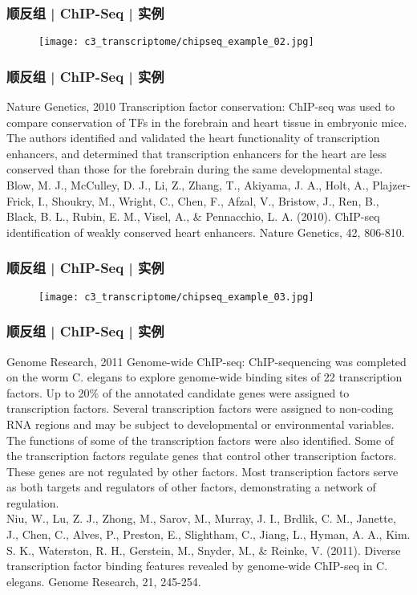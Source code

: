 \begin{frame}
  \frametitle{顺反组 | ChIP-Seq | 实例}
  \begin{figure}
    \centering
    \texttt{[image: c3\_transcriptome/chipseq\_example\_02.jpg]}
  \end{figure}
\end{frame}

\begin{frame}
  \frametitle{顺反组 | ChIP-Seq | 实例}
  \begin{block}{Nature Genetics, 2010}
  Transcription factor conservation: ChIP-seq was used to compare conservation of TFs in the forebrain and heart tissue in embryonic mice. The authors identified and validated the heart functionality of transcription enhancers, and determined that transcription enhancers for the heart are less conserved than those for the forebrain during the same developmental stage.\\
  \vspace{0.5em}
  Blow, M. J., McCulley, D. J., Li, Z., Zhang, T., Akiyama, J. A., Holt, A., Plajzer-Frick, I., Shoukry, M., Wright, C., Chen, F., Afzal, V., Bristow, J., Ren, B., Black, B. L., Rubin, E. M., Visel, A., \& Pennacchio, L. A. (2010). ChIP-seq identification of weakly conserved heart enhancers. Nature Genetics, 42, 806-810.
  \end{block}
\end{frame}

\begin{frame}
  \frametitle{顺反组 | ChIP-Seq | 实例}
  \begin{figure}
    \centering
    \texttt{[image: c3\_transcriptome/chipseq\_example\_03.jpg]}
  \end{figure}
\end{frame}

\begin{frame}
  \frametitle{顺反组 | ChIP-Seq | 实例}
  {\footnotesize
  \begin{block}{Genome Research, 2011}
  Genome-wide ChIP-seq: ChIP-sequencing was completed on the worm C. elegans to explore genome-wide binding sites of 22 transcription factors. Up to 20\% of the annotated candidate genes were assigned to transcription factors. Several transcription factors were assigned to non-coding RNA regions and may be subject to developmental or environmental variables. The functions of some of the transcription factors were also identified. Some of the transcription factors regulate genes that control other transcription factors. These genes are not regulated by other factors. Most transcription factors serve as both targets and regulators of other factors, demonstrating a network of regulation.\\
  \vspace{0.5em}
  Niu, W., Lu, Z. J., Zhong, M., Sarov, M., Murray, J. I., Brdlik, C. M., Janette, J., Chen, C., Alves, P., Preston, E., Slightham, C., Jiang, L., Hyman, A. A., Kim. S. K., Waterston, R. H., Gerstein, M., Snyder, M., \& Reinke, V. (2011). Diverse transcription factor binding features revealed by genome-wide ChIP-seq in C. elegans. Genome Research, 21, 245-254.
  \end{block}
}
\end{frame}

